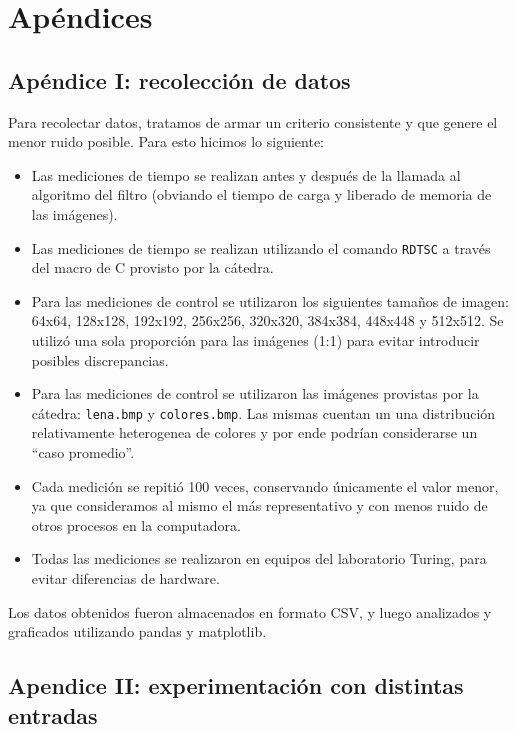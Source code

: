 \section{Apéndices}
 	\subsection{Apéndice I: recolección de datos}

 	Para recolectar datos, tratamos de armar un criterio consistente y que genere el menor ruido posible. Para esto hicimos lo siguiente:

 	\begin{itemize}
 		\item Las mediciones de tiempo se realizan antes y después de la llamada al algoritmo del filtro (obviando el tiempo de carga y liberado de memoria de las imágenes).

 		\item Las mediciones de tiempo se realizan utilizando el comando \texttt{RDTSC} a través del macro de C provisto por la cátedra.

 		\item Para las mediciones de control se utilizaron los siguientes tamaños de imagen: 64x64, 128x128, 192x192, 256x256, 320x320, 384x384, 448x448 y 512x512. Se utilizó una sola proporción para las imágenes (1:1) para evitar introducir posibles discrepancias.

 		\item Para las mediciones de control se utilizaron las imágenes provistas por la cátedra: \texttt{lena.bmp} y \texttt{colores.bmp}. Las mismas cuentan un una distribución relativamente heterogenea de colores y por ende podrían considerarse un “caso promedio”.

 		\item Cada medición se repitió 100 veces, conservando únicamente el valor menor, ya que consideramos al mismo el más representativo y con menos ruido de otros procesos en la computadora.

 		\item Todas las mediciones se realizaron en equipos del laboratorio Turing, para evitar diferencias de hardware.
 	\end{itemize}

 	Los datos obtenidos fueron almacenados en formato CSV, y luego analizados y graficados utilizando pandas y matplotlib.

 	\subsection{Apendice II: experimentación con distintas entradas}

